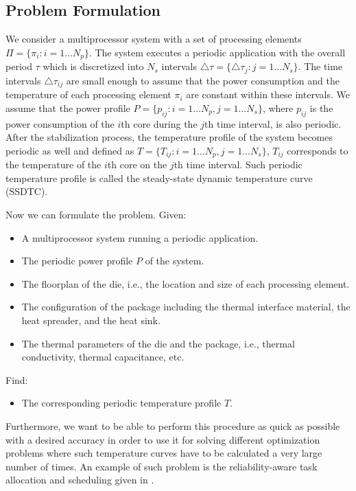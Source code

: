 \subsection{Problem Formulation}
We consider a multiprocessor system with a set of processing elements $\Pi = \{ \pi_i: i = 1 \dots N_p \}$. The system executes a periodic application with the overall period $\tau$ which is discretized into $N_s$ intervals $\triangle \tau = \{ \triangle \tau_j: j = 1 \dots N_s \}$. The time intervals $\triangle \tau_{ij}$ are small enough to assume that the power consumption and the temperature of each processing element $\pi_i$ are constant within these intervals. We assume that the power profile $P = \{ p_{ij}: i = 1 \dots N_p, j = 1 \dots N_s \}$, where $p_{ij}$ is the power consumption of the $i$th core during the $j$th time interval, is also periodic. After the stabilization process, the temperature profile of the system becomes periodic as well and defined as $T = \{ T_{ij}: i = 1 \dots N_p, j = 1 \dots N_s \}$, ${T_{ij}}$ corresponds to the temperature of the ${i}$th core on the $j$th time interval. Such periodic temperature profile is called the steady-state dynamic temperature curve (SSDTC).

Now we can formulate the problem. Given:
\begin{itemize}
  \item A multiprocessor system running a periodic application.
  \item The periodic power profile $P$ of the system.
  \item The floorplan of the die, i.e., the location and size of each processing element.
  \item The configuration of the package including the thermal interface material, the heat spreader, and the heat sink.
  \item The thermal parameters of the die and the package, i.e., thermal conductivity, thermal capacitance, etc.
\end{itemize}
Find:
\begin{itemize}
  \item The corresponding periodic temperature profile $T$.
\end{itemize}

Furthermore, we want to be able to perform this procedure as quick as possible with a desired accuracy in order to use it for solving different optimization problems where such temperature curves have to be calculated a very large number of times. An example of such problem is the reliability-aware task allocation and scheduling given in .

